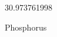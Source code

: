 \documentclass[12pt]{article}
\begin{document}
\hfill{}
\vfill
\begin{center}
  {\fontsize{50}{60}
  }

  30.973761998

Phosphorus
\end{center}
\vfill
\end{document}
